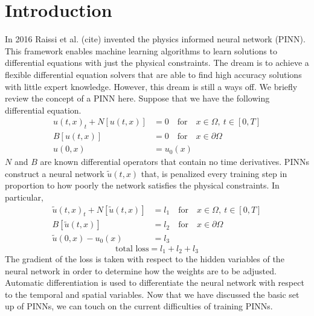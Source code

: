 \documentclass[12pt]{article}
\def\~{\tilde}
\begin{document}
\vfill
\newpage
\section{Introduction}

In 2016 Raissi et al. (cite) invented the physics informed neural network (PINN). This framework enables machine learning algorithms to learn solutions to differential equations with just the physical constraints. The dream is to achieve a flexible differential equation solvers that are able to find high accuracy solutions with little expert knowledge. However, this dream is still a ways off. We briefly review the concept of a PINN here. Suppose that we have the following differential equation.
\begin{align*}
	u(t,x)_t + N[u(t,x)] &= 0 \quad \text{for} \quad x \in \Omega, \: t \in [0,T]\\
	B[u(t,x)] &= 0 \quad \text{for} \quad x \in \partial \Omega\\
	u(0,x) &= u_0(x)
\end{align*}
$N$ and $B$ are known differential operators that contain no time derivatives. PINNs construct a neural network $\~u(t,x)$ that, is penalized every training step in proportion to how poorly the network satisfies the physical constraints. In particular,
\begin{align*}
	\~u(t,x)_t + N[\~u(t,x)] &= l_1 \quad \text{for} \quad x \in \Omega, \: t \in [0,T]\\
	B[\~u(t,x)] &= l_2 \quad \text{for} \quad x \in \partial \Omega\\
	\~u(0,x) - u_0(x)& = l_3
\end{align*}
\begin{equation*}
\text{total loss} = l_1 + l_2 + l_3
\end{equation*}
The gradient of the loss is taken with respect to the hidden variables of the neural network in order to determine how the weights are to be adjusted. Automatic differentiation is used to differentiate the neural network with respect to the temporal and spatial variables. Now that we have discussed the basic set up of PINNs, we can touch on the current difficulties of training PINNs.
\end{document}
